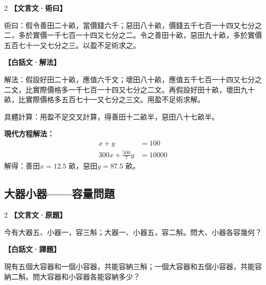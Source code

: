 \documentclass[11pt,a4paper]{article}
\newcommand{\zhc}{}[1]{{\CJKfamily{\CJKrmdefault}#1}}  %
\newcommand{\zhm}[1]{{\CJKfamily{\CJKrmdefault}#1}}  %
\newenvironment{prob bilingual}[1][]{%
  \begin{paracol}{2}%
  \setlength{\columnseprule}{0.4pt}%
}{%
  \end{paracol}%
  \medskip%
}
\begin{document}
\begin{paracol}{2}
\switchcolumn[0]
\noindent\textbf{\textcolor{notecolor}{\zhc{【文言文·術曰】}}}\par\smallskip
\zhc{
術曰：假令善田二十畝，當價錢六千；惡田八十畝，價錢五千七百一十四又七分之二，多於實價一千七百一十四又七分之二。令之善田十畝，惡田九十畝，多於實價五百七十一又七分之三。以盈不足術求之。
}

\switchcolumn[1]
\noindent\textbf{\textcolor{notecolor}{\zhm{【白話文·解法】}}}\par\smallskip
\zhm{
解法：假設好田二十畝，應值六千文；壞田八十畝，應值五千七百一十四又七分之二文，比實際價格多一千七百一十四又七分之二文。再假設好田十畝，壞田九十畝，比實際價格多五百七十一又七分之三文。用盈不足術求解。

具體計算：用盈不足交叉計算，得善田十二畝半，惡田八十七畝半。
}
\end{paracol}

\medskip

\noindent\textbf{\textcolor{sectioncolor}{\zhc{現代方程解法：}}}
\begin{align*}
x + y &= 100 \\
300x + \frac{500}{7}y &= 10000
\end{align*}
解得：\zhc{善田}$x = 12.5$ 畝，\zhc{惡田}$y = 87.5$ 畝。

\vspace{0.5cm}

\subsection{\zhc{大器小器——容量問題}}

\begin{paracol}{2}
\switchcolumn[0]
\noindent\textbf{\textcolor{notecolor}{\zhc{【文言文·原題】}}}\par\smallskip
\zhc{
今有大器五、小器一，容三斛；大器一、小器五，容二斛。問大、小器各容幾何？
}

\switchcolumn[1]
\noindent\textbf{\textcolor{notecolor}{\zhm{【白話文·譯題】}}}\par\smallskip
\zhm{
現有五個大容器和一個小容器，共能容納三斛；一個大容器和五個小容器，共能容納二斛。問大容器和小容器各能容納多少？
}
\end{paracol}

\medskip
\end{document}
